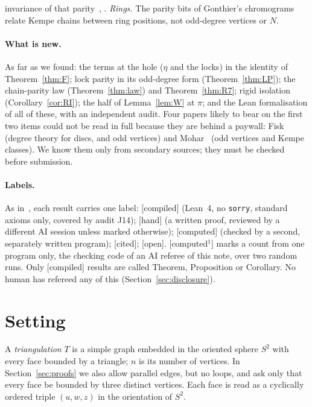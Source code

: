\documentclass[11pt]{article}
\theoremstyle{definition}
\newcommand{\lab}[1]{\textsf{[#1]}}
\newcommand{\labone}{\textsf{[computed$^1$]}}
\begin{document}
invariance of that parity~\cite[Sec.~5]{mohar2006}, \cite{moharsalas2009}. \emph{Rings.} The parity bits of Gonthier's chromograms~\cite{gonthier2005} relate Kempe chains between ring positions, not odd-degree vertices or $N$.

\paragraph{What is new.} As far as we found: the terms at the hole ($\eta$ and the locks) in the identity of Theorem~\ref{thm:F}; lock parity in its odd-degree form (Theorem~\ref{thm:LP}); the chain-parity law (Theorem~\ref{thm:law}) and Theorem~\ref{thm:R7}; rigid isolation (Corollary~\ref{cor:RI}); the half of Lemma~\ref{lem:W} at $\pi$; and the Lean formalisation of all of these, with an independent audit. Four papers likely to bear on the first two items could not be read in full because they are behind a paywall: Fisk~\cite{fisk1973,fisk1977,fisk1978} (degree theory for discs, and odd vertices) and Mohar~\cite{mohar1985} (odd vertices and Kempe classes). We know them only from secondary sources; they must be checked before submission.

\paragraph{Labels.} As in~\cite{vhe2026}, each result carries one label: \lab{compiled} (Lean~4, no \texttt{sorry}, standard axioms only, covered by audit J14); \lab{hand} (a written proof, reviewed by a different AI session unless marked otherwise); \lab{computed} (checked by a second, separately written program); \lab{cited}; \lab{open}. \labone{} marks a count from one program only, the checking code of an AI referee of this note, over two random runs. Only \lab{compiled} results are called Theorem, Proposition or Corollary. No human has refereed any of this (Section~\ref{sec:disclosure}).

\section{Setting}\label{sec:setting}
A \emph{triangulation} $T$ is a simple graph embedded in the oriented sphere $S^2$ with every face bounded by a triangle; $n$ is its number of vertices. In Section~\ref{sec:proofs} we also allow parallel edges, but no loops, and ask only that every face be bounded by three distinct vertices. Each face is read as a cyclically ordered triple $(u,w,z)$ in the orientation of $S^2$.
\end{document}
